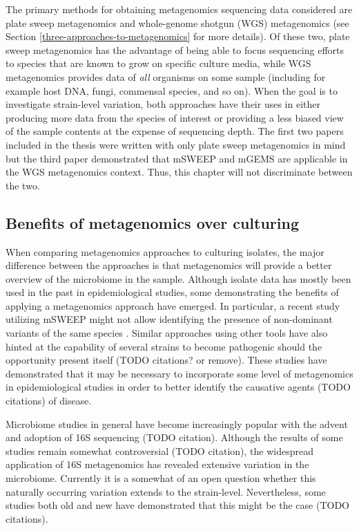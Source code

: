 \documentclass[officiallayout]{tktla}
\begin{document}
The primary methods for obtaining metagenomics sequencing data
considered are plate sweep metagenomics and whole-genome shotgun (WGS)
metagenomics (see Section \ref{three-approaches-to-metagenomics} for
more details). Of these two, plate sweep metagenomics has the
advantage of being able to focus sequencing efforts to species that
are known to grow on specific culture media, while WGS metagenomics
provides data of \textit{all} organisms on some sample (including for
example host DNA, fungi, commensal species, and so on). When the goal
is to investigate strain-level variation, both approaches have their
uses in either producing more data from the species of interest or
providing a less biased view of the sample contents at the expense of
sequencing depth. The first two papers included in the thesis were
written with only plate sweep metagenomics in mind but the third paper
demonstrated that mSWEEP and mGEMS are applicable in the WGS
metagenomics context. Thus, this chapter will not discriminate between
the two.

\subsection{Benefits of metagenomics over culturing}

When comparing metagenomics approaches to culturing isolates, the
major difference between the approaches is that metagenomics will
provide a better overview of the microbiome in the sample. Although
isolate data has mostly been used in the past in epidemiological
studies, some demonstrating the benefits of applying a metagenomics
approach have emerged. In particular, a recent study utilizing mSWEEP
might not allow identifying the presence of non-dominant variants of
the same species \citep{tonkin-hill_pneumococcal_2022}. Similar
approaches using other tools have also hinted at the capability of
several strains to become pathogenic should the opportunity present
itself (TODO citations? or remove). These studies have demonstrated
that it may be necessary to incorporate some level of metagenomics in
epidemiological studies in order to better identify the causative
agents (TODO citations) of disease.

Microbiome studies in general have become increasingly popular with
the advent and adoption of 16S sequencing (TODO citation). Although
the results of some studies remain somewhat controversial (TODO
citation), the widespread application of 16S metagenomics has revealed
extensive variation in the microbiome. Currently it is a somewhat of
an open question whether this naturally occurring variation extends to
the strain-level. Nevertheless, some studies both old and new have
demonstrated that this might be the case (TODO citations).
\end{document}
